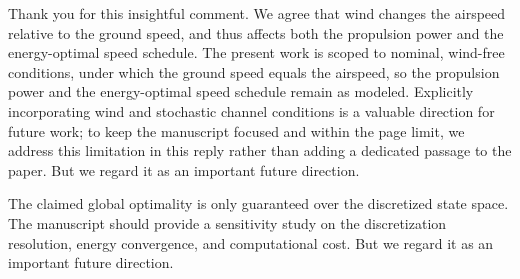 \begin{revresponse}[]
	Thank you for this insightful comment. We agree that wind changes the airspeed relative to the ground speed, and thus affects both the propulsion power and the energy-optimal speed schedule. The present work is scoped to nominal, wind-free conditions, under which the ground speed equals the airspeed, so the propulsion power and the energy-optimal speed schedule remain as modeled. Explicitly incorporating wind and stochastic channel conditions is a valuable direction for future work; to keep the manuscript focused and within the page limit, we address this limitation in this reply rather than adding a dedicated passage to the paper. But we regard it as an important future direction. 
\end{revresponse}

\begin{revcomment}
	The claimed global optimality is only guaranteed over the discretized state space. The manuscript should provide a sensitivity study on the discretization resolution, energy convergence, and computational cost. But we regard it as an important future direction.
\end{revcomment}

